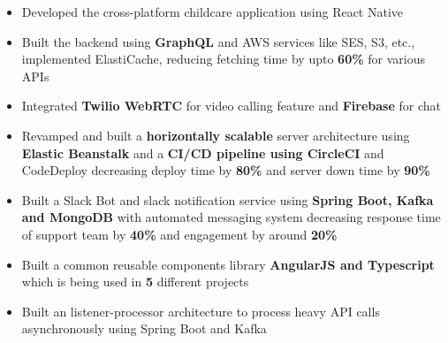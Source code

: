 \documentclass[10pt,a4paper,ragged2e,withhyper]{altacv}
\begin{document}
\begin{paracol}{2}



\begin{itemize}
\item Developed the cross-platform childcare application using React Native
\item Built the backend using {\bf GraphQL} and AWS services like SES, S3, etc., implemented ElastiCache, reducing fetching time by upto {\bf 60\%} for various APIs
\item Integrated {\bf Twilio WebRTC} for video calling feature and {\bf Firebase} for chat
\item Revamped and built a {\bf horizontally scalable} server architecture using {\bf Elastic Beanstalk} and a {\bf CI/CD pipeline using CircleCI} and CodeDeploy decreasing deploy time by {\bf 80\%} and server down time by {\bf 90\%} 
\end{itemize}

\divider\smallskip

\begin{itemize}
\item Built a Slack Bot and slack notification service using {\bf Spring Boot, Kafka and MongoDB} with automated messaging system decreasing response time of support team by {\bf 40\%} and engagement by around {\bf 20\%}
\item Built a common reusable components library {\bf AngularJS and Typescript} which is being used in {\bf 5} different projects
\item Built an listener-processor architecture to process heavy API calls asynchronously using Spring Boot and Kafka
\end{itemize}

\divider\smallskip



\end{paracol}
\end{document}
